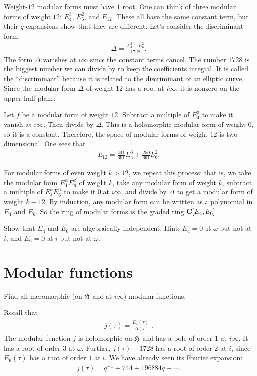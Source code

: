 \documentclass[11pt, oneside,margin=1in]{article}
\begin{document}
Weight-$12$ modular forms must have $1$ root. One can think of three modular forms of weight $12$: $E_4^3$, $E_6^2$, and $E_{12}$. These all have the same constant term, but their $q$-expansions show that they are different. Let's consider the discriminant form:
\begin{align*}
	\Delta = \frac{E_4^3 -E_6^2 }{1728}.
\end{align*}
The form $\Delta$ vanishes at $i\infty$ since the constant terms cancel. The number $1728$ is the biggest number we can divide by to keep the coefficients integral. It is called the ``discriminant'' because it is related to the discriminant of an elliptic curve. Since the modular form $\Delta$ of weight $12$ has a root at $i\infty$, it is nonzero on the upper-half plane. 

Let $f$ be a modular form of weight $12$. Subtract a multiple of $E_4^3$ to make it vanish at $i\infty$. Then divide by $\Delta$. This is a holomorphic modular form of weight $0$, so it is a constant. Therefore, the space of modular forms of weight $12$ is two-dimensional. One sees that
\begin{align*}
	E_{12} = \frac{441}{691}E_4^3 + \frac{250}{691}E_6^2.
\end{align*}

For modular forms of even weight $k>12$, we repeat this process: that is, we take the modular form $E_4^\alpha E_6^\beta$ of weight $k$, take any modular form of weight $k$, subtract a multiple of $E_4^\alpha E_6^\beta$ to make it $0$ at $i\infty$, and divide by $\Delta$ to get a modular form of weight $k-12$. By induction, any modular form can be written as a polynomial in $E_4$ and $E_6$. So the ring of modular forms is the graded ring $\mathbf C[E_4,E_6]$.

\begin{exercise}\label{}\text{}
Show that $E_4$ and $E_6$ are algebraically independent. Hint: $E_4=0$ at $\omega$ but not at $i$, and $E_6=0$ at $i$ but not at $\omega$.
\end{exercise}

\section{Modular functions}
\begin{problem}
	Find all meromorphic (on $\mathfrak H$ and at $i\infty$) modular functions. 
\end{problem}

Recall that
\begin{align*}
	j(\tau) =  \frac{E_4(\tau)^3}{\Delta(\tau)}.
\end{align*}
The modular function $j$ is holomorphic on $\mathfrak H$ and has a pole of order $1$ at $i\infty$. It has a root of order $3$ at $\omega$. Further, $j(\tau)-1728$ has a root of order $2$ at $i$, since $E_6(\tau)$ has a root of order $1$ at $i$. We have already seen its Fourier expansion:
\begin{align*}
	j(\tau) = q ^{-1} + 744 + 196884q + \cdots.
\end{align*}
\end{document}
